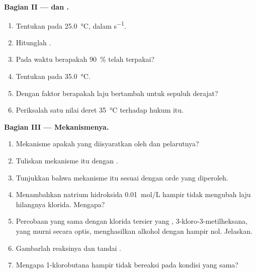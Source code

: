 \begin{problem}
\medskip
\noindent\textbf{Bagian II ---  dan .}
\begin{enumerate}[resume]
  \item Tentukan  pada \qty{25.0}{\celsius}, dalam
        \unit{s^{-1}}.
  \item Hitunglah .
  \item Pada waktu berapakah \qty{90}{\percent}  telah terpakai?
  \item Tentukan  pada \qty{35.0}{\celsius}.
  \item Dengan faktor berapakah laju bertambah untuk sepuluh derajat?
  \item Periksalah satu nilai deret \qty{35}{\celsius} terhadap hukum
        itu.
\end{enumerate}

\medskip
\noindent\textbf{Bagian III --- Mekanismenya.}
\begin{enumerate}[resume]
  \item Mekanisme apakah yang diisyaratkan oleh  dan pelarutnya?
  \item Tuliskan mekanisme itu dengan .
  \item Tunjukkan bahwa mekanisme itu sesuai dengan orde yang diperoleh.
  \item Menambahkan natrium hidroksida \qty{0.01}{mol/L} hampir tidak
        mengubah laju hilangnya klorida. Mengapa?
  \item Percobaan yang sama dengan klorida tersier yang ,
        3-kloro-3-metilheksana, yang murni secara optis, menghasilkan
        alkohol dengan  hampir nol. Jelaskan.
  \item Gambarlah  reaksinya dan tandai .
  \item Mengapa 1-klorobutana hampir tidak bereaksi pada kondisi yang
        sama?
\end{enumerate}


\end{problem}
